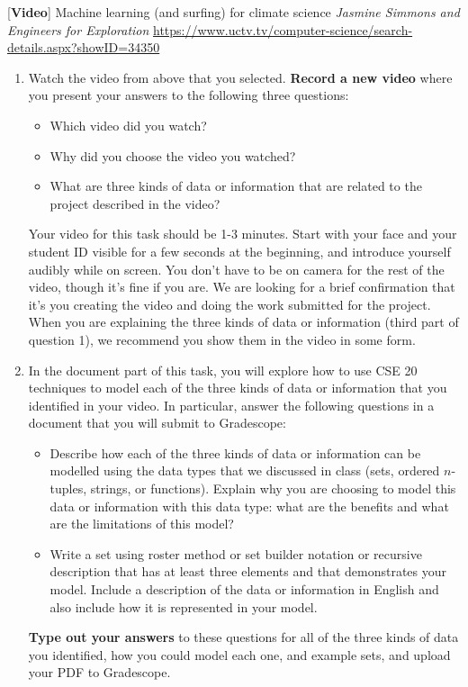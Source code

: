 \documentclass[12pt, oneside]{article}
\begin{document}
[{\bf Video}] Machine learning (and surfing) for climate science {\it Jasmine Simmons and Engineers for Exploration}
{\small \url{https://www.uctv.tv/computer-science/search-details.aspx?showID=34350}}



\begin{enumerate}
\item Watch the video from above that you selected. {\bf Record a new video} where you present 
your answers to the following three questions:
\begin{itemize}
    \item Which video did you watch?
    \item Why did you choose the video you watched?
    \item What are three kinds of data or information that are related to the project described in the video?
\end{itemize}
Your video for this task should be 1-3 minutes. Start with 
your face and your student ID visible for a few seconds at the beginning, and introduce yourself audibly while on screen. 
You don't have to be on camera for the rest of the video, though it's fine if you are. 
We are looking for a brief confirmation that it's you creating the video and doing the work 
submitted for the project. When you are explaining the three kinds of data or information (third part of question 1), 
we recommend you show them in the video in some form.

\item In the document part of this task, you will explore how to use CSE 20 techniques to 
model each of the three kinds of data or 
information that you identified in 
your video. In particular, answer the following questions in a document 
that you will submit to Gradescope:
\begin{itemize}
    \item Describe how each of the three kinds of data or information 
    can be modelled using the data types that we discussed in class (sets, ordered $n$-tuples, 
    strings, or functions). Explain why you are choosing to model this data or information with this data type: what are the benefits 
    and what are the limitations of this model?
    \item Write a set using roster method or set builder notation or recursive description that has at least three elements
    and that demonstrates
    your model. Include a description of the data or information in English and also include how it is represented 
    in your model.
\end{itemize}
{\bf Type out your answers} to these questions for all of the three kinds of data you identified, 
how you could model each one, and example sets, and upload your PDF 
to Gradescope.
\end{enumerate}
\end{document}

